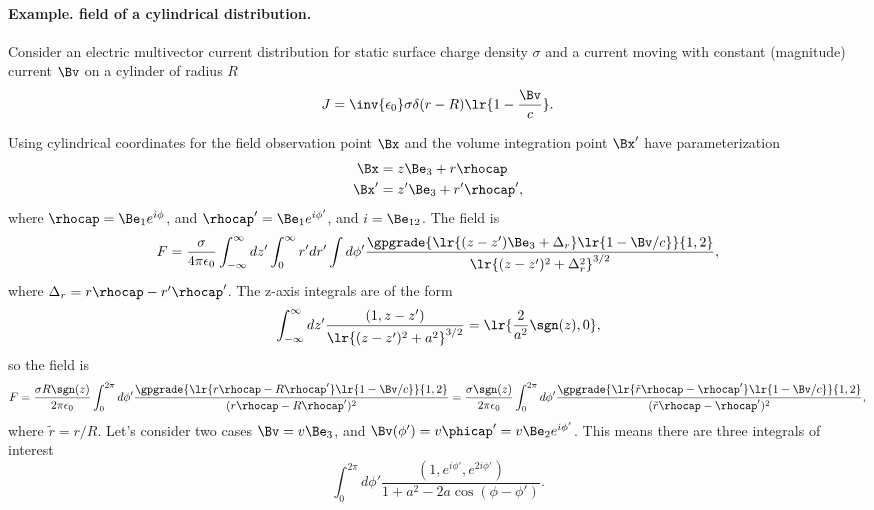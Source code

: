 %
%

\paragraph{Example.  field of a cylindrical distribution.}

Consider an electric multivector current distribution for static surface charge density \( \sigma \) and a current moving with constant (magnitude) current \( \Bv \) on a cylinder of radius \( R \)
\begin{dmath}\label{eqn:cylinderField:20}
J = \inv{\epsilon_0} \sigma \delta( r - R ) \lr{ 1 - \frac{\Bv}{c} }.
\end{dmath}

Using cylindrical coordinates for the field observation point \( \Bx \) and the volume integration point \( \Bx' \) have parameterization
\begin{dmath}\label{eqn:cylinderField:40}
\begin{aligned}
\Bx &= z \Be_3 + r \rhocap \\
\Bx' &= z' \Be_3 + r' \rhocap',
\end{aligned}
\end{dmath}
where \( \rhocap = \Be_1 e^{i \phi} \), and \( \rhocap' = \Be_1 e^{i \phi'} \), and \( i = \Be_{12} \).
The field is
\begin{dmath}\label{eqn:cylinderField:60}
F = \frac{\sigma}{4 \pi \epsilon_0}
\int_{-\infty}^\infty dz' \int_0^\infty r' dr' \int d\phi' \frac{
   \gpgrade{ \lr{ (z-z') \Be_3 + \Delta_r }\lr{ 1 - \Bv/c }  }{1,2}
}{ \lr{ (z -z')^2 + \Delta_r^2 }^{3/2} },
\end{dmath}
where \( \Delta_r = r \rhocap - r' \rhocap' \).
The z-axis integrals are of the form
\begin{dmath}\label{eqn:cylinderField:80}
\int_{-\infty}^\infty dz' \frac{ (1, z-z') }{ \lr{(z-z')^2 + a^2 }^{3/2}}
=
\lr{ \frac{2}{a^2} \sgn(z), 0 },
\end{dmath}
so the field is
\begin{dmath}\label{eqn:cylinderField:100}
F
=
\frac{\sigma R \sgn(z)}{2 \pi \epsilon_0}
\int_0^{2 \pi} d\phi' \frac{
   \gpgrade{ \lr{ r\rhocap - R \rhocap' } \lr{ 1 - \Bv/c } }{1,2}
}
{ (r\rhocap - R \rhocap')^2 }
=
\frac{\sigma \sgn(z)}{2 \pi \epsilon_0}
\int_0^{2 \pi} d\phi' \frac{
   \gpgrade{ \lr{ \tilde{r}\rhocap - \rhocap' } \lr{ 1 - \Bv/c } }{1,2}
}
{ (\tilde{r}\rhocap - \rhocap')^2 },
\end{dmath}
where \( \tilde{r} = r/R \).
Let's consider two cases \( \Bv = v \Be_3 \), and \( \Bv(\phi') = v \phicap' = v \Be_2 e^{i\phi'} \).  This means there are three integrals of interest
\begin{dmath}\label{eqn:cylinderField:120}
\int_0^{2 \pi} d\phi' \frac{(1, e^{i\phi'}, e^{2 i\phi'})}{1 + a^2 - 2 a \cos(\phi-\phi')}.
\end{dmath}
